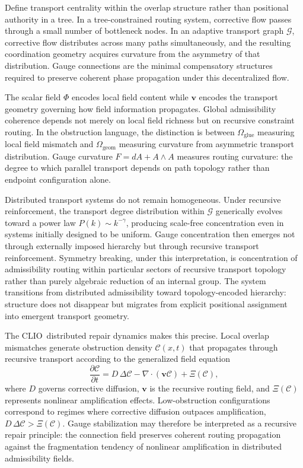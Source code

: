 \documentclass[12pt,a4paper]{article}
\newcommand{\CLIO}{\textrm{CLIO}}
\begin{document}
Define transport centrality within the overlap structure rather than positional
authority in a tree. In a tree-constrained routing system, corrective flow
passes through a small number of bottleneck nodes. In an adaptive transport
graph $\mathcal{G}$, corrective flow distributes across many paths simultaneously,
and the resulting coordination geometry acquires curvature from the asymmetry
of that distribution. Gauge connections are the minimal compensatory structures
required to preserve coherent phase propagation under this decentralized flow.

The scalar field $\Phi$ encodes local field content while $\mathbf{v}$ encodes
the transport geometry governing how field information propagates. Global
admissibility coherence depends not merely on local field richness but on
recursive constraint routing. In the obstruction language, the distinction is
between $\Omega_\mathrm{glue}$ measuring local field mismatch and
$\Omega_\mathrm{geom}$ measuring curvature from asymmetric transport
distribution. Gauge curvature $F=dA+A\wedge A$ measures routing curvature:
the degree to which parallel transport depends on path topology rather than
endpoint configuration alone.

Distributed transport systems do not remain homogeneous. Under recursive
reinforcement, the transport degree distribution within $\mathcal{G}$ generically
evolves toward a power law $P(k)\sim k^{-\gamma}$, producing scale-free
concentration even in systems initially designed to be uniform. Gauge
concentration then emerges not through externally imposed hierarchy but through
recursive transport reinforcement. Symmetry breaking, under this interpretation,
is concentration of admissibility routing within particular sectors of recursive
transport topology rather than purely algebraic reduction of an internal group.
The system transitions from distributed admissibility toward topology-encoded
hierarchy: structure does not disappear but migrates from explicit positional
assignment into emergent transport geometry.

The \CLIO\ distributed repair dynamics makes this precise. Local overlap
mismatches generate obstruction density $\mathcal{C}(x,t)$ that propagates
through recursive transport according to the generalized field equation
\[
\frac{\partial\mathcal{C}}{\partial t}
= D\,\Delta\mathcal{C}
- \nabla\cdot(\mathbf{v}\mathcal{C})
+ \Xi(\mathcal{C}),
\]
where $D$ governs corrective diffusion, $\mathbf{v}$ is the recursive routing
field, and $\Xi(\mathcal{C})$ represents nonlinear amplification effects.
Low-obstruction configurations correspond to regimes where corrective diffusion
outpaces amplification, $D\,\Delta\mathcal{C}>\Xi(\mathcal{C})$. Gauge
stabilization may therefore be interpreted as a recursive repair principle:
the connection field preserves coherent routing propagation against the
fragmentation tendency of nonlinear amplification in distributed admissibility
fields.
\end{document}
